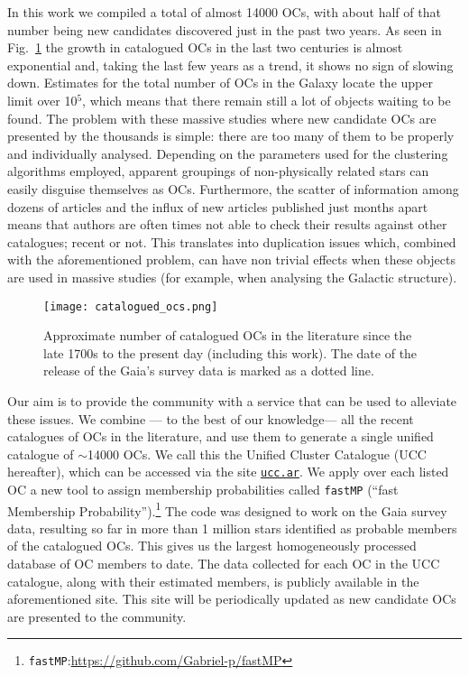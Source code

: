 \documentclass[fleqn,usenatbib]{mnras}
\begin{document}
In this work we compiled a total of almost 14000 OCs, with about half of that
number being new candidates discovered just in the past two years.
As seen in Fig.~\ref{fig:catalogued_ocs} the growth in catalogued OCs
in the last two centuries is almost exponential and, taking the last few years
as a trend, it shows no sign of slowing down. Estimates for the total number
of OCs in the Galaxy locate the upper limit over 10$^{5}$, which means that
there remain still a lot of objects waiting to be found.
%
The problem with these massive studies where new candidate OCs are presented by
the thousands is simple: there are too many of them to be properly and
individually analysed. Depending on the parameters used for the clustering
algorithms employed, apparent groupings of non-physically related stars can
easily disguise themselves as OCs.
Furthermore, the scatter of information among dozens of articles and the influx
of new articles published just months apart means that authors are often times
not able to check their results against other catalogues; recent or not. This
translates into duplication issues which, combined with the aforementioned
problem, can have non trivial effects when these objects are used in massive
studies (for example, when analysing the Galactic structure).

\begin{figure}
	\texttt{[image: catalogued\_ocs.png]}
    \caption{Approximate number of catalogued OCs in the literature since the
    late 1700s to the present day (including this work). The date of the
    release of the Gaia's survey data is marked as a dotted line.}
    \label{fig:catalogued_ocs}
\end{figure}

Our aim is to provide the community with a service that can be used to
alleviate these issues. We combine --- to the best of our knowledge--- all the
recent catalogues of OCs in the literature, and use them to generate a single
unified catalogue of $\sim$14000 OCs. We call this the Unified Cluster Catalogue
(UCC hereafter), which can be accessed via the site
\href{https://ucc.ar/}{\texttt{ucc.ar}}.
We apply over each listed OC a new tool
to assign membership probabilities called \texttt{fastMP} (``fast Membership
Probability'').\footnote{\texttt{fastMP}:\url{https://github.com/Gabriel-p/fastMP}}
The code was designed to work on the Gaia survey data, resulting
so far in more than 1 million stars identified as probable members of the
catalogued OCs. This gives us the largest homogeneously processed
database of OC members to date. The data collected for each OC in the UCC
catalogue, along with their estimated members, is publicly available in the
aforementioned site. This site will be periodically updated as new candidate OCs
are presented to the community.
\end{document}
